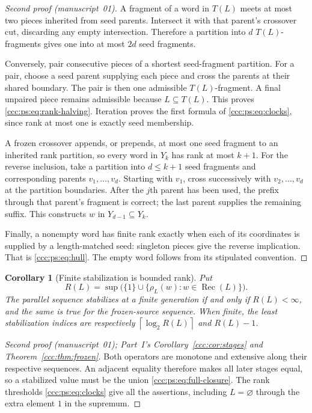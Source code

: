 \documentclass[11pt,letterpaper]{article}
\newtheorem{corollary}[theorem]{Corollary}
\theoremstyle{definition}
\theoremstyle{remark}
\newcommand{\rec}{\operatorname{Rec}}
\newcommand{\rank}{\rho}
\newcommand{\clog}[1]{\left\lceil\log_2 #1\right\rceil}
\begin{document}
\begin{proof}[Second proof (manuscript~01)]
A fragment of a word in $T(L)$ meets at most two pieces inherited from seed
parents. Intersect it with that parent's crossover cut, discarding any
empty intersection. Therefore a partition into $d$ $T(L)$-fragments gives
one into at most $2d$ seed fragments.

Conversely, pair consecutive pieces of a shortest seed-fragment partition.
For a pair, choose a seed parent supplying each piece and cross the parents
at their shared boundary. The pair is then one admissible $T(L)$-fragment.
A final unpaired piece remains admissible because $L\subseteq T(L)$.
This proves \eqref{ccc:ps:eq:rank-halving}. Iteration proves the first formula
of \eqref{ccc:ps:eq:clocks}, since rank at most one is exactly seed membership.

A frozen crossover appends, or prepends, at most one seed fragment to an
inherited rank partition, so every word in $Y_k$ has rank at most $k+1$.
For the reverse inclusion, take a partition into $d\le k+1$ seed fragments
and corresponding parents $v_1,\ldots,v_d$. Starting with $v_1$, cross
successively with $v_2,\ldots,v_d$ at the partition boundaries. After the
$j$th parent has been used, the prefix through that parent's fragment is
correct; the last parent supplies the remaining suffix. This constructs
$w$ in $Y_{d-1}\subseteq Y_k$.

Finally, a nonempty word has finite rank exactly when each of its
coordinates is supplied by a length-matched seed: singleton pieces give
the reverse implication. That is \eqref{ccc:ps:eq:hull}. The empty word follows
from its stipulated convention.
\end{proof}

\begin{corollary}[Finite stabilization is bounded rank]\label{ccc:ps:cor:bounded}
Put
\[
 R(L)=\sup\bigl(\{1\}\cup\{\rank_L(w):w\in\rec(L)\}\bigr).
\]
The parallel sequence stabilizes at a finite generation if and only if
$R(L)<\infty$, and the same is true for the frozen-source sequence.
When finite, the least stabilization indices are respectively
$\clog{R(L)}$ and $R(L)-1$.
\end{corollary}
\begin{proof}[Second proof (manuscript~01); Part~I's Corollary~\ref{ccc:cor:stages} and Theorem~\ref{ccc:thm:frozen}]
Both operators are monotone and extensive along their respective
sequences. An adjacent equality therefore makes all later stages equal,
so a stabilized value must be the union \eqref{ccc:ps:eq:full-closure}.
The rank thresholds \eqref{ccc:ps:eq:clocks} give all the assertions, including
$L=\varnothing$ through the extra element $1$ in the supremum.
\end{proof}
\end{document}
